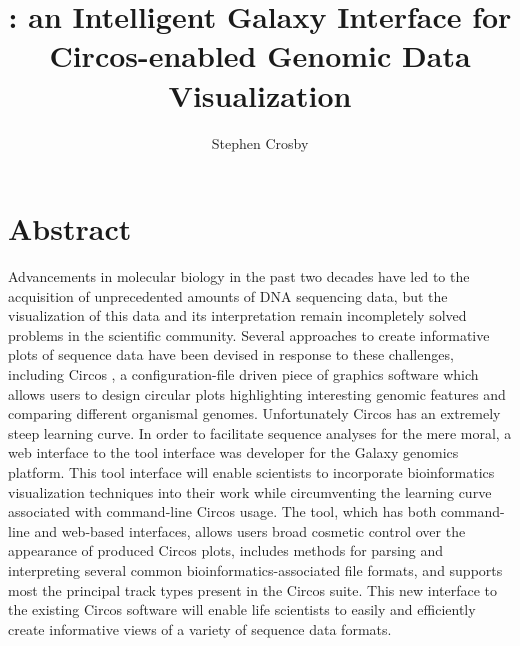 \documentclass[twocolumn]{article}
\title{\projectName: an Intelligent Galaxy Interface for Circos-enabled Genomic Data Visualization}
\author{Stephen Crosby}
\begin{document}
\maketitle
\section*{Abstract}
Advancements in molecular biology in the past two decades have led to the acquisition of
unprecedented amounts of DNA sequencing data, but the visualization of this data and its
interpretation remain incompletely solved problems in the scientific community. Several approaches to
create informative plots of sequence data have been devised in response to these challenges,
including Circos \cite{circospaper}, a configuration-file driven piece of graphics software which allows users to design circular plots highlighting
interesting genomic features and comparing different organismal genomes. Unfortunately Circos has an extremely steep learning curve.
In order to facilitate sequence analyses for the mere moral, a web interface to the tool interface was developer for the Galaxy \cite{galaxypaper} genomics platform.
This tool interface will enable scientists to incorporate bioinformatics visualization techniques into their work while circumventing the learning curve associated with command-line Circos usage. The tool, which has both command-line and web-based interfaces, allows users broad cosmetic control over the appearance of produced Circos plots, includes methods for parsing and interpreting several common bioinformatics-associated file formats, and supports most the principal track types present in the Circos suite. This new interface to the existing Circos software will enable life scientists to easily and efficiently create informative views of a variety of sequence data formats.
\end{document}
